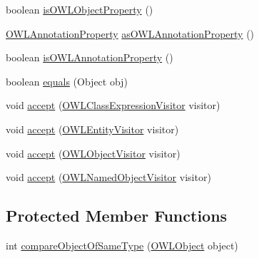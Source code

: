 \begin{DoxyCompactItemize}
\item 
boolean \hyperlink{classuk_1_1ac_1_1manchester_1_1cs_1_1owl_1_1owlapi_1_1_o_w_l_class_impl_aa17c534d2190ef355a5c86109807af72}{is\-O\-W\-L\-Object\-Property} ()
\item 
\hyperlink{interfaceorg_1_1semanticweb_1_1owlapi_1_1model_1_1_o_w_l_annotation_property}{O\-W\-L\-Annotation\-Property} \hyperlink{classuk_1_1ac_1_1manchester_1_1cs_1_1owl_1_1owlapi_1_1_o_w_l_class_impl_a079364be2f052d0bf2cde82f76c74bb1}{as\-O\-W\-L\-Annotation\-Property} ()
\item 
boolean \hyperlink{classuk_1_1ac_1_1manchester_1_1cs_1_1owl_1_1owlapi_1_1_o_w_l_class_impl_a4111c3ad2107606304d88118c29691e6}{is\-O\-W\-L\-Annotation\-Property} ()
\item 
boolean \hyperlink{classuk_1_1ac_1_1manchester_1_1cs_1_1owl_1_1owlapi_1_1_o_w_l_class_impl_adcf0563cbf41c72cb0f0e97e5df6f9d6}{equals} (Object obj)
\item 
void \hyperlink{classuk_1_1ac_1_1manchester_1_1cs_1_1owl_1_1owlapi_1_1_o_w_l_class_impl_a6356ccd3ceb95e9eb0f1e1b2b85635b3}{accept} (\hyperlink{interfaceorg_1_1semanticweb_1_1owlapi_1_1model_1_1_o_w_l_class_expression_visitor}{O\-W\-L\-Class\-Expression\-Visitor} visitor)
\item 
void \hyperlink{classuk_1_1ac_1_1manchester_1_1cs_1_1owl_1_1owlapi_1_1_o_w_l_class_impl_a5656827092451f5a17b21d95de2c1e89}{accept} (\hyperlink{interfaceorg_1_1semanticweb_1_1owlapi_1_1model_1_1_o_w_l_entity_visitor}{O\-W\-L\-Entity\-Visitor} visitor)
\item 
void \hyperlink{classuk_1_1ac_1_1manchester_1_1cs_1_1owl_1_1owlapi_1_1_o_w_l_class_impl_a71e08efc3efa36ab3f99b2252ecb6c42}{accept} (\hyperlink{interfaceorg_1_1semanticweb_1_1owlapi_1_1model_1_1_o_w_l_object_visitor}{O\-W\-L\-Object\-Visitor} visitor)
\item 
void \hyperlink{classuk_1_1ac_1_1manchester_1_1cs_1_1owl_1_1owlapi_1_1_o_w_l_class_impl_a96511c6a884baac5b9df0e7c8d6753be}{accept} (\hyperlink{interfaceorg_1_1semanticweb_1_1owlapi_1_1model_1_1_o_w_l_named_object_visitor}{O\-W\-L\-Named\-Object\-Visitor} visitor)
\end{DoxyCompactItemize}
\subsection*{Protected Member Functions}
\begin{DoxyCompactItemize}
\item 
int \hyperlink{classuk_1_1ac_1_1manchester_1_1cs_1_1owl_1_1owlapi_1_1_o_w_l_class_impl_aea73c5976b8e268e3bd27826494c163e}{compare\-Object\-Of\-Same\-Type} (\hyperlink{interfaceorg_1_1semanticweb_1_1owlapi_1_1model_1_1_o_w_l_object}{O\-W\-L\-Object} object)
\end{DoxyCompactItemize}
